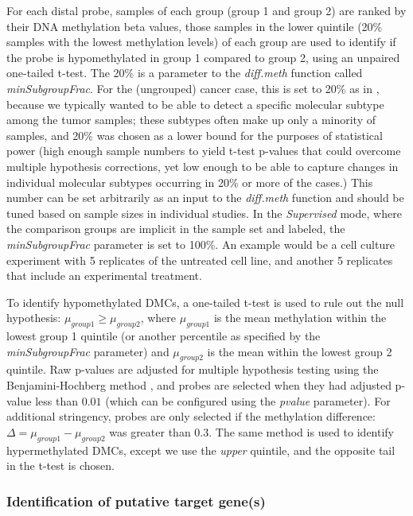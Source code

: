 For each distal probe, samples of each group (group 1 and group 2) are ranked by their DNA methylation beta values, those samples in the lower quintile (20\% samples with the lowest methylation levels) of each group are used to identify if the probe is hypomethylated in group 1 compared to group 2, using an unpaired one-tailed t-test. The 20\% is a parameter to the \textit{diff.meth} function called \textit{minSubgroupFrac}. For the (ungrouped) cancer case, this is set to 20\% as in , because we typically wanted to be able to detect a specific molecular subtype among the tumor samples; these subtypes often make up only a minority of samples, and 20\% was chosen as a lower bound for the purposes of statistical power (high enough sample numbers to yield t-test p-values that could overcome multiple hypothesis corrections, yet low enough to be able to capture changes in individual molecular subtypes occurring in 20\% or more of the cases.) This number can be set arbitrarily as an input to the \textit{diff.meth} function and should be tuned based on sample sizes in individual studies. In the \textit{Supervised} mode, where the comparison groups are implicit in the sample set and labeled, the \textit{minSubgroupFrac} parameter is set to 100\%.  An example would be a cell culture experiment with 5 replicates of the untreated cell line, and another 5 replicates that include an experimental treatment.

To identify hypomethylated DMCs, a one-tailed t-test is used to rule out the null hypothesis: $\mu_{group1} \geq \mu_{group2}$, where $\mu_{group1}$ is the mean methylation within the lowest group 1 quintile (or another percentile as specified by the \textit{minSubgroupFrac} parameter) and $\mu_{group2}$ is the mean within the lowest group 2 quintile. Raw p-values are adjusted for multiple hypothesis testing using the Benjamini-Hochberg method \cite{benjamini1995controlling}, and probes are selected when they had adjusted p-value less than $0.01$ (which can be configured using the \textit{pvalue} parameter). For additional stringency, probes are only selected if the methylation difference: $\Delta = \mu_{group1} - \mu_{group2}$ was greater than $0.3$. The same method is used to identify hypermethylated DMCs, except we use the \textit{upper} quintile, and the opposite tail in the t-test is chosen.

\subsubsection*{Identification of putative target gene(s)} 

